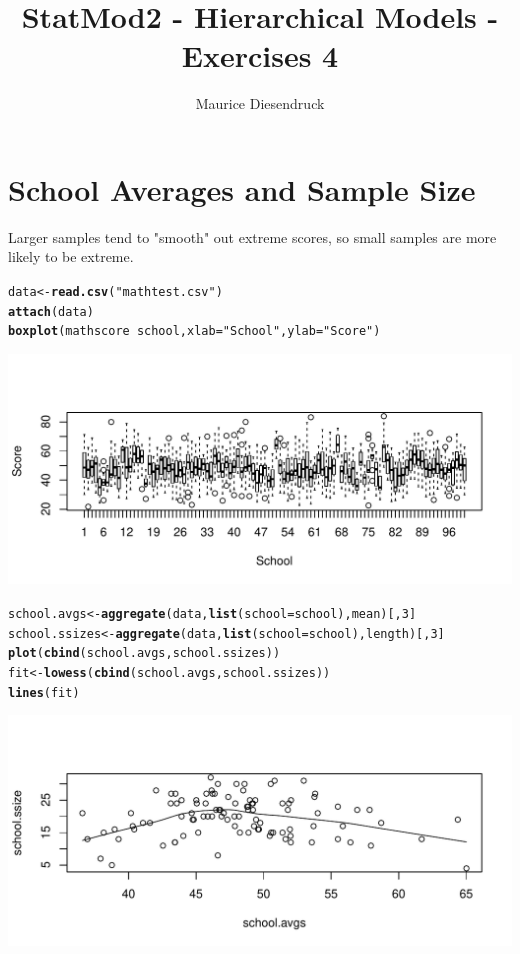 \documentclass[12pt,letterpaper]{article}\usepackage[]{graphicx}\usepackage[]{color}
\author{Maurice Diesendruck\vspace{-2ex}}
\title{StatMod2 - Hierarchical Models - Exercises 4\vspace{-1ex}}
\makeatletter
\def\maxwidth{ %
  \ifdim\Gin@nat@width>\linewidth
    \linewidth
  \else
    \Gin@nat@width
  \fi
}
\newcommand{\hlnum}[1]{\textcolor[rgb]{0.686,0.059,0.569}{#1}}%
\newcommand{\hlstr}[1]{\textcolor[rgb]{0.192,0.494,0.8}{#1}}%
\newcommand{\hlopt}[1]{\textcolor[rgb]{0,0,0}{#1}}%
\newcommand{\hlstd}[1]{\textcolor[rgb]{0.345,0.345,0.345}{#1}}%
\newcommand{\hlkwb}[1]{\textcolor[rgb]{0.69,0.353,0.396}{#1}}%
\newcommand{\hlkwc}[1]{\textcolor[rgb]{0.333,0.667,0.333}{#1}}%
\newcommand{\hlkwd}[1]{\textcolor[rgb]{0.737,0.353,0.396}{\textbf{#1}}}%
\newenvironment{kframe}{%
 \def\at@end@of@kframe{}%
 \ifinner\ifhmode%
  \def\at@end@of@kframe{\end{minipage}}%
  \begin{minipage}{\columnwidth}%
 \fi\fi%
 \def\FrameCommand##1{\hskip\@totalleftmargin \hskip-\fboxsep
 \colorbox{shadecolor}{##1}\hskip-\fboxsep
     \hskip-\linewidth \hskip-\@totalleftmargin \hskip\columnwidth}%
 \MakeFramed {\advance\hsize-\width
   \@totalleftmargin\z@ \linewidth\hsize
   \@setminipage}}%
 {\par\unskip\endMakeFramed%
 \at@end@of@kframe}
\newenvironment{knitrout}{}{} %
\makeatother
\begin{document}
\maketitle

\section{School Averages and Sample Size}

Larger samples tend to "smooth" out extreme scores, so small samples are more 
likely to be extreme.\\

\begin{knitrout}
\color{fgcolor}\begin{kframe}
\begin{alltt}
\hlstd{data} \hlkwb{<-} \hlkwd{read.csv}\hlstd{(}\hlstr{"mathtest.csv"}\hlstd{)}
\hlkwd{attach}\hlstd{(data)}
\hlkwd{boxplot}\hlstd{(mathscore} \hlopt{~} \hlstd{school,} \hlkwc{xlab}\hlstd{=}\hlstr{"School"}\hlstd{,} \hlkwc{ylab}\hlstd{=}\hlstr{"Score"}\hlstd{)}
\end{alltt}
\end{kframe}
\includegraphics[width=\maxwidth]{figure/unnamed-chunk-1-1} 
\begin{kframe}\begin{alltt}
\hlstd{school.avgs} \hlkwb{<-} \hlkwd{aggregate}\hlstd{(data,} \hlkwd{list}\hlstd{(}\hlkwc{school}\hlstd{=school), mean)[,}\hlnum{3}\hlstd{]}
\hlstd{school.ssizes} \hlkwb{<-} \hlkwd{aggregate}\hlstd{(data,} \hlkwd{list}\hlstd{(}\hlkwc{school}\hlstd{=school), length)[,}\hlnum{3}\hlstd{]}
\hlkwd{plot}\hlstd{(}\hlkwd{cbind}\hlstd{(school.avgs, school.ssizes))}
\hlstd{fit} \hlkwb{<-} \hlkwd{lowess}\hlstd{(}\hlkwd{cbind}\hlstd{(school.avgs, school.ssizes))}
\hlkwd{lines}\hlstd{(fit)}
\end{alltt}
\end{kframe}
\includegraphics[width=\maxwidth]{figure/unnamed-chunk-1-2} 

\end{knitrout}
\end{document}
